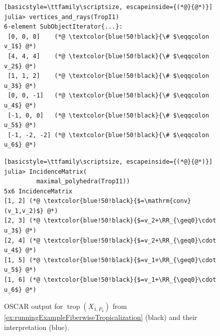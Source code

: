 \documentclass[12pt,reqno,a4paper]{amsart}
\theoremstyle{theoremstyle}
\theoremstyle{examplestyle}
\theoremstyle{algorithmstyle}
\newcommand{\RR}{\mathbb{R}}
\DeclareMathOperator{\Trop}{trop}
\begin{document}
\begin{figure}[t]
  \centering
  \begin{minipage}[t]{0.475\linewidth}
\begin{lstlisting}[basicstyle=\ttfamily\scriptsize, escapeinside={(*@}{@*)}]
julia> vertices_and_rays(TropI1)
6-element SubObjectIterator{...}:
 [0, 0, 0]    (*@ \textcolor{blue!50!black}{\# $\eqqcolon v_1$} @*)
 [4, 4, 4]    (*@ \textcolor{blue!50!black}{\# $\eqqcolon v_2$} @*)
 [1, 1, 2]    (*@ \textcolor{blue!50!black}{\# $\eqqcolon u_3$} @*)
 [0, 0, -1]   (*@ \textcolor{blue!50!black}{\# $\eqqcolon u_4$} @*)
 [-1, 0, 0]   (*@ \textcolor{blue!50!black}{\# $\eqqcolon u_5$} @*)
 [-1, -2, -2] (*@ \textcolor{blue!50!black}{\# $\eqqcolon u_6$} @*)
\end{lstlisting}
  \end{minipage}
  \begin{minipage}[t]{0.475\linewidth}
\begin{lstlisting}[basicstyle=\ttfamily\scriptsize, escapeinside={(*@}{@*)}]
julia> IncidenceMatrix(
         maximal_polyhedra(TropI1))
5x6 IncidenceMatrix
[1, 2] (*@ \textcolor{blue!50!black}{$=\mathrm{conv}(v_1,v_2)$} @*)
[2, 3] (*@ \textcolor{blue!50!black}{$=v_2+\RR_{\geq0}\cdot u_3$} @*)
[2, 4] (*@ \textcolor{blue!50!black}{$=v_2+\RR_{\geq0}\cdot u_4$} @*)
[1, 5] (*@ \textcolor{blue!50!black}{$=v_1+\RR_{\geq0}\cdot u_5$} @*)
[1, 6] (*@ \textcolor{blue!50!black}{$=v_1+\RR_{\geq0}\cdot u_6$} @*)
\end{lstlisting}
  \end{minipage}
  \caption{OSCAR output for $\Trop(X_{1,P_4})$ from \cref{ex:runningExampleFiberwiseTropicalization} (black) and their interpretation (blue).}
  \label{fig:OSCARcomputation}
\end{figure}
\end{document}
